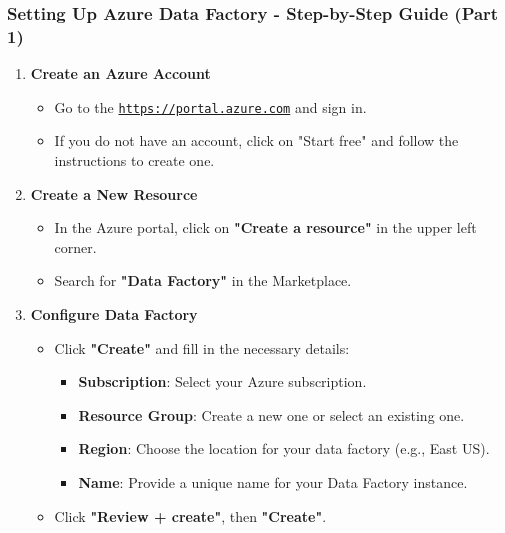 \documentclass[aspectratio=169]{beamer}
\begin{document}
\begin{frame}[fragile]
    \frametitle{Setting Up Azure Data Factory - Step-by-Step Guide (Part 1)}
    \begin{enumerate}
        \item \textbf{Create an Azure Account}
            \begin{itemize}
                \item Go to the \underline{\texttt{https://portal.azure.com}} and sign in.
                \item If you do not have an account, click on "Start free" and follow the instructions to create one.
            \end{itemize}
        
        \item \textbf{Create a New Resource}
            \begin{itemize}
                \item In the Azure portal, click on \textbf{"Create a resource"} in the upper left corner.
                \item Search for \textbf{"Data Factory"} in the Marketplace.
            \end{itemize}
        
        \item \textbf{Configure Data Factory}
            \begin{itemize}
                \item Click \textbf{"Create"} and fill in the necessary details: 
                \begin{itemize}
                    \item \textbf{Subscription}: Select your Azure subscription.
                    \item \textbf{Resource Group}: Create a new one or select an existing one. 
                    \item \textbf{Region}: Choose the location for your data factory (e.g., East US).
                    \item \textbf{Name}: Provide a unique name for your Data Factory instance.
                \end{itemize}
                \item Click \textbf{"Review + create"}, then \textbf{"Create"}.
            \end{itemize}
    \end{enumerate}
\end{frame}
\end{document}
